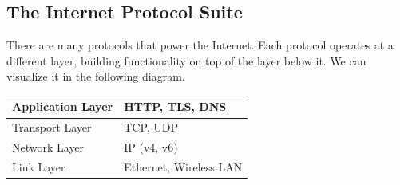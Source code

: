 \documentclass{article}
\begin{document}
  \subsection{The Internet Protocol Suite}
  There are many protocols that power the Internet. Each protocol operates at a different layer, building functionality on top of the layer below it. We can visualize it in the following diagram. 
  \begin{center}
  \begin{tabular}{l|l}
      Application Layer & HTTP, TLS, DNS\\
      \hline
      Transport Layer & TCP, UDP \\
      \hline
      Network Layer & IP (v4, v6) \\
      \hline
      Link Layer & Ethernet, Wireless LAN
  \end{tabular}
  \end{center}
\end{document}

